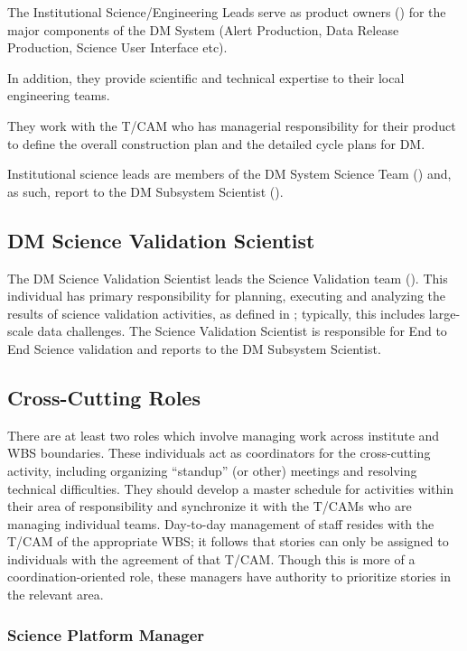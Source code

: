 The Institutional Science/Engineering Leads serve as product owners () for the major components of the DM System (Alert Production, Data Release Production, Science User Interface etc).

In addition, they provide scientific and technical expertise to their local engineering teams.

They work with the T/CAM who has managerial responsibility for their product to define the overall construction plan and the detailed cycle plans for DM.

Institutional science leads are members of the DM System Science Team () and, as such, report to the DM Subsystem Scientist ().

\subsection{DM Science Validation Scientist}
\label{role:dmsvs}

The DM Science Validation Scientist leads the Science Validation team ().
This individual has primary responsibility for planning, executing and analyzing the results of science validation activities, as defined in ; typically, this includes large-scale data challenges.
The Science Validation Scientist is responsible for End to End Science validation and reports to the DM Subsystem Scientist.

\subsection{Cross-Cutting Roles}\label{role:crosscut}

There are at least two roles which involve managing work across institute and WBS boundaries.
These individuals act as coordinators for the cross-cutting activity, including organizing ``standup'' (or other) meetings and resolving technical difficulties.
They should develop a master schedule for activities within their area of responsibility and synchronize it with the T/CAMs who are managing individual teams.
Day-to-day management of staff resides with the T/CAM of the appropriate WBS; it follows that stories can only be assigned to individuals with the agreement of that T/CAM.
Though this is more of a coordination-oriented role, these managers have authority to prioritize stories in the relevant area.

\subsubsection{Science Platform Manager}\label{role:lsplead}

